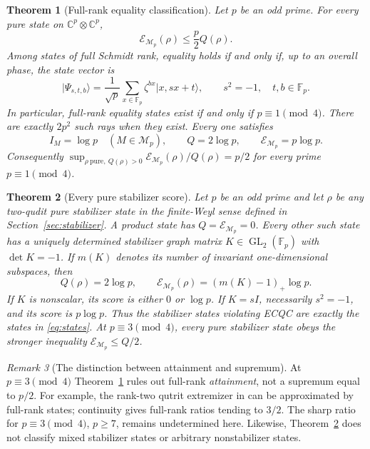 \documentclass[11pt]{article}
\newtheorem{theorem}{Theorem}[section]
\theoremstyle{remark}\newtheorem{remark}[theorem]{Remark}
\newcommand{\F}{\mathbb F}
\newcommand{\C}{\mathbb C}
\newcommand{\M}{\mathcal M}
\newcommand{\E}{\mathcal E}
\newcommand{\ket}[1]{\lvert#1\rangle}
\begin{document}
\begin{theorem}[Full-rank equality classification]\label{thm:full}
Let $p$ be an odd prime. For every pure state on $\C^p\otimes\C^p$,
\begin{equation}\label{eq:bound}
 \E_{\M_p}(\rho)\le\frac p2 Q(\rho).
\end{equation}
Among states of full Schmidt rank, equality holds if and only if, up to an overall phase, the state vector is
\begin{equation}\label{eq:states}
 \ket{\Psi_{s,t,b}}=\frac1{\sqrt p}\sum_{x\in\F_p}\zeta^{b x}\ket{x,sx+t},
 \qquad s^2=-1,\quad t,b\in\F_p.
\end{equation}
In particular, full-rank equality states exist if and only if $p\equiv1\pmod4$. There are exactly $2p^2$ such rays when they exist. Every one satisfies
\[
 I_M=\log p\quad(M\in\M_p),\qquad Q=2\log p,\qquad \E_{\M_p}=p\log p.
\]
Consequently $\sup_{\rho\ \mathrm{pure},\ Q(\rho)>0}\E_{\M_p}(\rho)/Q(\rho)=p/2$ for every prime $p\equiv1\pmod4$.
\end{theorem}

\begin{theorem}[Every pure stabilizer score]\label{thm:stabilizer}
Let $p$ be an odd prime and let $\rho$ be any two-qudit pure stabilizer state in the finite-Weyl sense defined in Section~\ref{sec:stabilizer}. A product state has $Q=\E_{\M_p}=0$. Every other such state has a uniquely determined stabilizer graph matrix $K\in\operatorname{GL}_2(\F_p)$ with $\det K=-1$. If $m(K)$ denotes its number of invariant one-dimensional subspaces, then
\begin{equation}\label{eq:stabilizer-score}
 Q(\rho)=2\log p,\qquad \E_{\M_p}(\rho)=(m(K)-1)_+\log p.
\end{equation}
If $K$ is nonscalar, its score is either $0$ or $\log p$. If $K=sI$, necessarily $s^2=-1$, and its score is $p\log p$. Thus the stabilizer states violating ECQC are \emph{exactly} the states in \eqref{eq:states}. At $p\equiv3\pmod4$, every pure stabilizer state obeys the stronger inequality $\E_{\M_p}\le Q/2$.
\end{theorem}

\begin{remark}[The distinction between attainment and supremum]
At $p\equiv3\pmod4$ Theorem~\ref{thm:full} rules out full-rank \emph{attainment}, not a supremum equal to $p/2$. For example, the rank-two qutrit extremizer in \cite{previous} can be approximated by full-rank states; continuity gives full-rank ratios tending to $3/2$. The sharp ratio for $p\equiv3\pmod4$, $p\ge7$, remains undetermined here. Likewise, Theorem~\ref{thm:stabilizer} does not classify mixed stabilizer states or arbitrary nonstabilizer states.
\end{remark}
\end{document}
